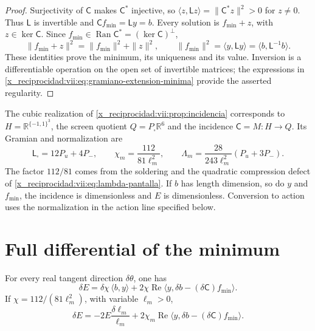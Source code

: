 \begin{proof}
Surjectivity of \(\mathsf C\) makes \(\mathsf C^*\) injective,
so \(\langle z,\mathsf Lz\rangle=\|\mathsf C^*z\|^2>0\)
for \(z\ne0\). Thus \(\mathsf L\) is invertible and
\(\mathsf C f_{\min}=\mathsf L y=b\). Every solution is
\(f_{\min}+z\), with \(z\in\ker\mathsf C\). Since
\(f_{\min}\in\operatorname{Ran}\mathsf C^*=(\ker\mathsf C)^\perp\),
\[
 \|f_{\min}+z\|^2=\|f_{\min}\|^2+\|z\|^2,
 \qquad
 \|f_{\min}\|^2=\langle y,\mathsf L y\rangle
 =\langle b,\mathsf L^{-1}b\rangle.
\]
These identities prove the minimum, its uniqueness and its value. Inversion is a differentiable operation on the open set of invertible matrices; the expressions in \eqref{x_reciprocidad:vii:eq:gramiano-extension-minima} provide the asserted regularity.
\end{proof}

The cubic realization of \ref{x_reciprocidad:vii:prop:incidencia} corresponds to \(H=\mathbb R^{\{-1,1\}^3}\), the screen quotient \(Q=P_\square\mathbb R^6\) and the incidence \(\mathsf C=M:H\to Q\). Its Gramian and normalization are
\begin{equation}
 \mathsf L_\square=12P_u+4P_-,\qquad
 \chi_m=\frac{112}{81\ell_m^2},\qquad
 \Lambda_m=\frac{28}{243\ell_m^2}(P_u+3P_-).
 \label{x_reciprocidad:vii:eq:normalizacion-minimo-cubico}
\end{equation}
The factor \(112/81\) comes from the soldering and the quadratic compression defect of \eqref{x_reciprocidad:vii:eq:lambda-pantalla}. If \(b\) has length dimension, so do \(y\) and \(f_{\min}\), the incidence is dimensionless and \(E\) is dimensionless. Conversion to action uses the normalization in the action line specified below.

\section{Full differential of the minimum}
\label{x_reciprocidad:vii:subsec:diferencial-minimo}

\begin{theorem}
\label{x_reciprocidad:vii:thm:diferencial-minimo}
For every real tangent direction \(\delta\theta\), one has
\begin{equation}
 \delta E
 =\delta\chi\,\langle b,y\rangle
   +2\chi\operatorname{Re}
       \langle y,\delta b-(\delta\mathsf C)f_{\min}\rangle.
 \label{x_reciprocidad:vii:eq:diferencial-minimo-completo}
\end{equation}
If \(\chi=112/(81\ell_m^2)\), with variable \(\ell_m>0\),
\begin{equation}
 \delta E=-2E\frac{\delta\ell_m}{\ell_m}
 +2\chi_m\operatorname{Re}
       \langle y,\delta b-(\delta\mathsf C)f_{\min}\rangle.
 \label{x_reciprocidad:vii:eq:diferencial-minimo-escala}
\end{equation}
\end{theorem}

